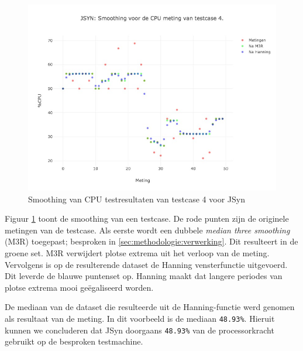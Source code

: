\begin{figure}
    		\centering
    		\includegraphics[width=0.75\linewidth]{medians/jsyn_cpu_4}
    		\caption{Smoothing van CPU testresultaten van testcase 4  voor JSyn}
    		\label{jsyn_cpu_4}
\end{figure}

Figuur \ref{jsyn_cpu_4} toont de smoothing van een testcase. De rode punten zijn de originele metingen van de testcase. Als eerste wordt een dubbele \textit{median three smoothing} (M3R) toegepast; besproken in \ref{sec:methodologie:verwerking}. Dit resulteert in de groene set. M3R verwijdert plotse extrema uit het verloop van de meting. Vervolgens is op de resulterende dataset de Hanning vensterfunctie uitgevoerd. Dit leverde de blauwe puntenset op. Hanning maakt dat langere periodes van plotse extrema mooi geëgaliseerd worden.

De mediaan van de dataset die resulteerde uit de Hanning-functie werd genomen als resultaat van de meting. In dit voorbeeld is de mediaan \verb+48.93%+. Hieruit kunnen we concluderen dat JSyn doorgaans \verb+48.93%+ van de processorkracht gebruikt op de besproken testmachine.

